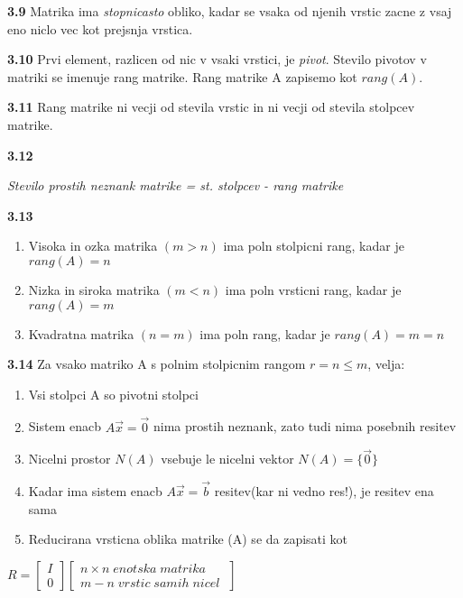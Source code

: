 \documentclass{article}
\begin{document}
\begin{multicols}{2}
	\textbf{3.9} Matrika ima \textit{stopnicasto} obliko, kadar se vsaka od njenih vrstic zacne z vsaj eno
	niclo vec kot prejsnja vrstica.

	\textbf{3.10} Prvi element, razlicen od nic v vsaki vrstici, je \textit{pivot}. Stevilo pivotov v matriki
	se imenuje rang matrike. Rang matrike A zapisemo kot $rang(A)$.

	\textbf{3.11} Rang matrike ni vecji od stevila vrstic in ni vecji od stevila stolpcev matrike.

	\textbf{3.12}
	\begin{center}
		\textit{Stevilo prostih neznank matrike = st. stolpcev - rang matrike}
	\end{center}

	\textbf{3.13}
	\begin{enumerate}
		\item Visoka in ozka matrika $(m > n)$ ima poln stolpicni rang, kadar je $rang(A) = n$
		\item Nizka in siroka matrika $(m < n)$ ima poln vrsticni rang, kadar je $rang(A) = m$
		\item Kvadratna matrika $(n = m)$ ima poln rang, kadar je $rang(A) = m = n$
	\end{enumerate}

	\textbf{3.14} Za vsako matriko A s polnim stolpicnim rangom $r = n \leq m$, velja:
	\begin{enumerate}
		\item Vsi stolpci A so pivotni stolpci
		\item Sistem enacb $A\vec{x} = \vec{0}$ nima prostih neznank, zato tudi nima posebnih resitev
		\item Nicelni prostor $N(A)$ vsebuje le nicelni vektor $N(A) = \{\vec{0}\}$
		\item Kadar ima sistem enacb $A\vec{x} = \vec{b}$ resitev(kar ni vedno res!), je resitev ena sama
		\item Reducirana vrsticna oblika matrike (A) se da zapisati kot
	\end{enumerate}
	\begin{center}
		$R =
			\begin{bmatrix}
				I \\
				0
			\end{bmatrix}
			\begin{bmatrix}
				n \times n\; enotska\; matrika \\
				m - n\; vrstic\; samih\; nicel\;
			\end{bmatrix}
		$
	\end{center}


\end{multicols}
\end{document}
